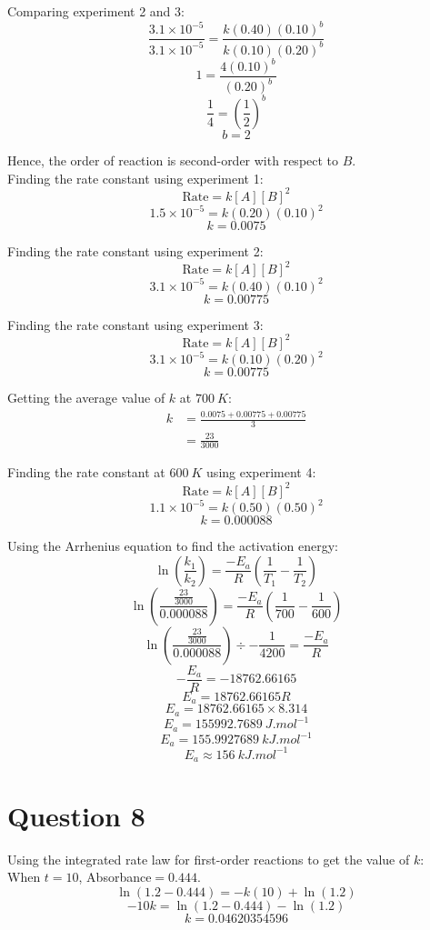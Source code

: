 \documentclass[11pt]{article}
\begin{document}
Comparing experiment 2 and 3:
\[\frac{3.1 \times 10^{-5}}{3.1 \times 10^{-5}} = \frac{k(0.40)(0.10)^b}{k(0.10)(0.20)^b}\]
\[1 = \frac{4(0.10)^b}{(0.20)^b}\]
\[\frac{1}{4} = \left( \frac{1}{2} \right)^b\]
\[b = 2\]

Hence, the order of reaction is second-order with respect to \(B\).
\\[0pt]

Finding the rate constant using experiment 1:
\[\text{Rate} = k[A][B]^2\]
\[1.5 \times 10^{-5} = k(0.20)(0.10)^2\]
\[k = 0.0075\]

Finding the rate constant using experiment 2:
\[\text{Rate} = k[A][B]^2\]
\[3.1 \times 10^{-5} = k(0.40)(0.10)^2\]
\[k = 0.00775\]

Finding the rate constant using experiment 3:
\[\text{Rate} = k[A][B]^2\]
\[3.1 \times 10^{-5} = k(0.10)(0.20)^2\]
\[k = 0.00775\]

Getting the average value of \(k\) at \(\qty{700}{\unit{K}}\):
\begin{align*}
k &= \frac{0.0075 + 0.00775 + 0.00775}{3} \\
&= \frac{23}{3000}
\end{align*}

Finding the rate constant at \(\qty{600}{\unit{K}}\) using experiment 4:
\[\text{Rate} = k[A][B]^2\]
\[1.1 \times 10^{-5} = k(0.50)(0.50)^2\]
\[k = 0.000088\]

Using the Arrhenius equation to find the activation energy:
\[\ln \left( \frac{k_1}{k_2} \right) = \frac{-E_a}{R} \left( \frac{1}{T_1} - \frac{1}{T_2} \right)\]
\[\ln \left( \frac{\frac{23}{3000}}{0.000088} \right) = \frac{-E_a}{R} \left( \frac{1}{700} - \frac{1}{600} \right)\]
\[\ln \left( \frac{\frac{23}{3000}}{0.000088} \right) \div -\frac{1}{4200} = \frac{-E_a}{R}\]
\[-\frac{E_a}{R} = -18762.66165\]
\[E_a = 18762.66165R\]
\[E_a = 18762.66165 \times 8.314 \]
\[E_a = \qty{155992.7689}{\unit{J.mol^{-1}}}\]
\[E_a = \qty{155.9927689}{\unit{kJ.mol^{-1}}}\]
\[E_a \approx \qty{156}{\unit{kJ.mol^{-1}}}\]


\section{Question 8}
\label{sec:org60c17ba}

Using the integrated rate law for first-order reactions to get the value of \(k\):
\\[0pt]

When \(t = 10\), Absorbance\(= 0.444\).
\[\ln (1.2 - 0.444) = - k(10) + \ln (1.2)\]
\[-10k = \ln (1.2 - 0.444) - \ln (1.2)\]
\[k = 0.04620354596\]
\end{document}
